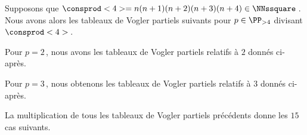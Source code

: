 Supposons que $\consprod<4> = n(n+1)(n+2)(n+3)(n+4) \in \NNssquare$\,. Nous avons alors les tableaux de Vogler partiels suivants pour $p \in \PP_{>4}$ divisant $\consprod<4>$\,.

\begin{center}
\end{center}


Pour $p = 2$\,, nous avons les tableaux de Vogler partiels relatifs à $2$ donnés ci-après.

\begin{center}
\end{center}



Pour $p = 3$\,, nous obtenons les tableaux de Vogler partiels relatifs à $3$ donnés ci-après.

\begin{center}
\end{center}


La multiplication de tous les tableaux de Vogler partiels précédents donne les $15$ cas suivants.

